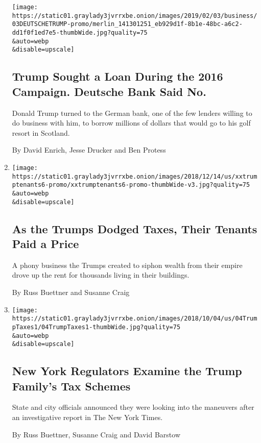 \begin{enumerate}
  \texttt{[image: https://static01.graylady3jvrrxbe.onion/images/2019/02/03/business/03DEUTSCHETRUMP-promo/merlin\_141301251\_eb929d1f-8b1e-48bc-a6c2-dd1f0f1ed7e5-thumbWide.jpg?quality=75\\\&auto=webp\\\&disable=upscale]}

  \hypertarget{trump-sought-a-loan-during-the-2016-campaign-deutsche-bank-said-no}{%
  \subsection{Trump Sought a Loan During the 2016 Campaign. Deutsche
  Bank Said
  No.}\label{trump-sought-a-loan-during-the-2016-campaign-deutsche-bank-said-no}}

  Donald Trump turned to the German bank, one of the few lenders willing
  to do business with him, to borrow millions of dollars that would go
  to his golf resort in Scotland.

  By David Enrich, Jesse Drucker and Ben Protess
\item
  \href{/2018/12/15/us/politics/trump-tenants-taxes.html}{}

  \texttt{[image: https://static01.graylady3jvrrxbe.onion/images/2018/12/14/us/xxtrumptenants6-promo/xxtrumptenants6-promo-thumbWide-v3.jpg?quality=75\\\&auto=webp\\\&disable=upscale]}

  \hypertarget{as-the-trumps-dodged-taxes-their-tenants-paid-a-price}{%
  \subsection{As the Trumps Dodged Taxes, Their Tenants Paid a
  Price}\label{as-the-trumps-dodged-taxes-their-tenants-paid-a-price}}

  A phony business the Trumps created to siphon wealth from their empire
  drove up the rent for thousands living in their buildings.

  By Russ Buettner and Susanne Craig
\item
  \href{/2018/10/04/us/politics/donald-trump-fred-trump-tax-schemes.html}{}

  \texttt{[image: https://static01.graylady3jvrrxbe.onion/images/2018/10/04/us/04TrumpTaxes1/04TrumpTaxes1-thumbWide.jpg?quality=75\\\&auto=webp\\\&disable=upscale]}

  \hypertarget{new-york-regulators-examine-the-trump-familys-tax-schemes}{%
  \subsection{New York Regulators Examine the Trump Family's Tax
  Schemes}\label{new-york-regulators-examine-the-trump-familys-tax-schemes}}

  State and city officials announced they were looking into the
  maneuvers after an investigative report in The New York Times.

  By Russ Buettner, Susanne Craig and David Barstow
\end{enumerate}

